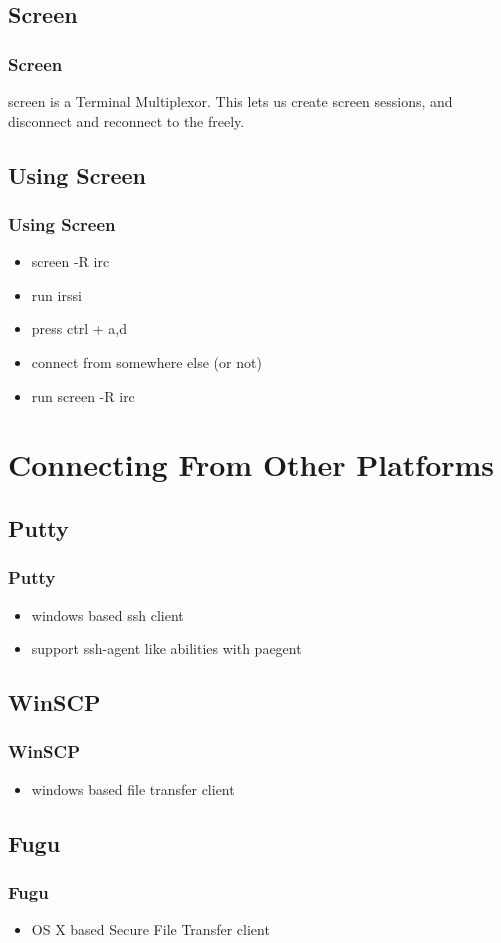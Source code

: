 \documentclass[hyperref={pdfpagelabels=false}]{beamer}
\begin{document}
\subsection{Screen}
\frame
{
  \frametitle{Screen}
  screen is a Terminal Multiplexor.
  This lets us create screen sessions, and disconnect and reconnect to the freely.
}
\subsection{Using Screen}
\frame
{
  \frametitle{Using Screen}
  \begin{itemize}
  \item{screen -R irc}
  \item{run irssi}
  \item{press ctrl + a,d}
  \item{connect from somewhere else (or not)}
  \item{run screen -R irc}
  \end{itemize}
}

\section{Connecting From Other Platforms}
\subsection{Putty}
\frame
{
    \frametitle{Putty}
    \begin{itemize}
    \item{windows based ssh client}
    \item{support ssh-agent like abilities with paegent}
    \end{itemize}
}
\subsection{WinSCP}
\frame
{
    \frametitle{WinSCP}
    \begin{itemize}
    \item{windows based file transfer client}
    \end{itemize}
}
\subsection{Fugu}
\frame
{
    \frametitle{Fugu}
    \begin{itemize}
    \item{OS X based Secure File Transfer client}
    \end{itemize}
}
\end{document}

